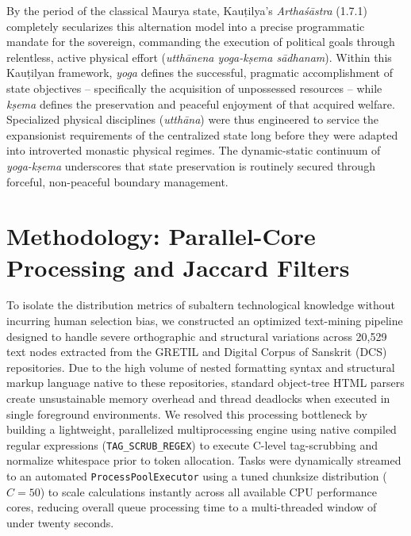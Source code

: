 \documentclass[11pt,twoside,letterpaper]{article}
\begin{document}
By the period of the classical Maurya state, Kauṭilya’s \textit{Arthaśāstra} (1.7.1) completely secularizes this alternation model into a precise programmatic mandate for the sovereign, commanding the execution of political goals through relentless, active physical effort (\textit{utthānena yoga-kṣema sādhanam}). Within this Kauṭilyan framework, \textit{yoga} defines the successful, pragmatic accomplishment of state objectives – specifically the acquisition of unpossessed resources – while \textit{kṣema} defines the preservation and peaceful enjoyment of that acquired welfare. Specialized physical disciplines (\textit{utthāna}) were thus engineered to service the expansionist requirements of the centralized state long before they were adapted into introverted monastic physical regimes. The dynamic-static continuum of \textit{yoga-kṣema} underscores that state preservation is routinely secured through forceful, non-peaceful boundary management.

\section{Methodology: Parallel-Core Processing and Jaccard Filters}
To isolate the distribution metrics of subaltern technological knowledge without incurring human selection bias, we constructed an optimized text-mining pipeline designed to handle severe orthographic and structural variations across 20,529 text nodes extracted from the GRETIL and Digital Corpus of Sanskrit (DCS) repositories. Due to the high volume of nested formatting syntax and structural markup language native to these repositories, standard object-tree HTML parsers create unsustainable memory overhead and thread deadlocks when executed in single foreground environments. We resolved this processing bottleneck by building a lightweight, parallelized multiprocessing engine using native compiled regular expressions (\texttt{TAG\_SCRUB\_REGEX}) to execute C-level tag-scrubbing and normalize whitespace prior to token allocation. Tasks were dynamically streamed to an automated \texttt{ProcessPoolExecutor} using a tuned chunksize distribution ($C = 50$) to scale calculations instantly across all available CPU performance cores, reducing overall queue processing time to a multi-threaded window of under twenty seconds.
\end{document}
